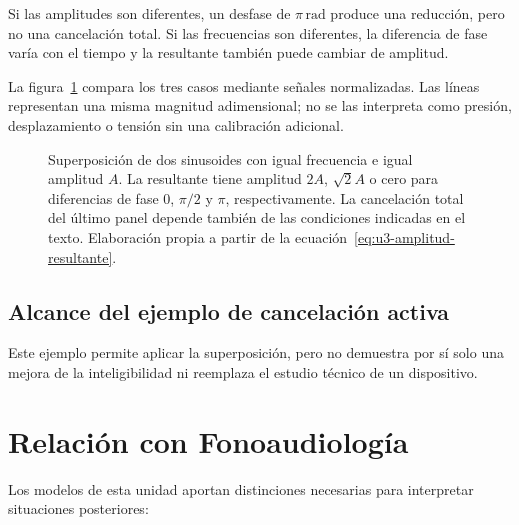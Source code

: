 Si las amplitudes son diferentes, un desfase de \(\pi\,\text{rad}\) produce
una reducción, pero no una cancelación total. Si las frecuencias son
diferentes, la diferencia de fase varía con el tiempo y la resultante también
puede cambiar de amplitud.

La figura~\ref{fig:u3-superposicion-desfase} compara los tres casos mediante
señales normalizadas. Las líneas representan una misma magnitud adimensional;
no se las interpreta como presión, desplazamiento o tensión sin una
calibración adicional.

\begin{figure}[htbp]
    \centering
    
    \caption{Superposición de dos sinusoides con igual frecuencia e igual
    amplitud \(A\). La resultante tiene amplitud \(2A\),
    \(\sqrt{2}A\) o cero para diferencias de fase \(0\),
    \(\pi/2\) y \(\pi\), respectivamente. La cancelación total del último
    panel depende también de las condiciones indicadas en el texto.
    Elaboración propia a partir de la
    ecuación~\eqref{eq:u3-amplitud-resultante}.}
    \label{fig:u3-superposicion-desfase}
\end{figure}

\subsection{Alcance del ejemplo de cancelación activa}
\label{sec:u3-anc}

 Este ejemplo permite aplicar la superposición, pero no demuestra
por sí solo una mejora de la inteligibilidad ni reemplaza el estudio técnico
de un dispositivo.

\section{Relación con Fonoaudiología}
\label{sec:u3-fonoaudiologia}

Los modelos de esta unidad aportan distinciones necesarias para interpretar
situaciones posteriores:


